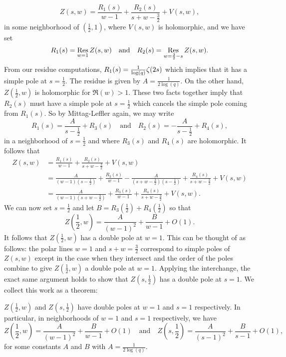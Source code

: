 \documentclass[12pt,reqno,oneside]{amsart}
\begin{document}
    \[
        Z(s,w) = \frac{R_{1}(s)}{w-1}+\frac{R_{2}(s)}{s+w-\frac{3}{2}}+V(s,w),
    \]
    in some neighborhood of $\left(\frac{1}{2},1\right)$, where $V(s,w)$ is holomorphic, and we have set
    \[
        R_{1}(s) = \operatorname*{\mathrm{Res}}_{w = 1}Z(s,w) \quad \text{and} \quad R_{2}(s) = \operatorname*{\mathrm{Res}}_{w = \frac{3}{2}-s}Z(s,w).
    \]
    From our residue computations, $R_{1}(s) = \frac{1}{\log(q)}\zeta(2s)$ which implies that it has a simple pole at $s = \frac{1}{2}$. The residue is given by $A = \frac{1}{2\log(q)}$. On the other hand, $Z\left(\frac{1}{2},w\right)$ is holomorphic for $\Re(w) > 1$. These two facts together imply that $R_{2}(s)$ must have a simple pole at $s = \frac{1}{2}$ which cancels the simple pole coming from $R_{1}(s)$. So by Mittag-Leffler again, we may write
    \[
        R_{1}(s) = \frac{A}{s-\frac{1}{2}}+R_{3}(s) \quad \text{and} \quad R_{2}(s) = -\frac{A}{s-\frac{1}{2}}+R_{4}(s),
    \]
    in a neighborhood of $s = \frac{1}{2}$ and where $R_{3}(s)$ and $R_{4}(s)$ are holomorphic. It follows that
    \begin{align*}
        Z(s,w) &= \frac{R_{1}(s)}{w-1}+\frac{R_{2}(s)}{s+w-\frac{3}{2}}+V(s,w) \\ 
        &= \frac{A}{(w-1)\left(s-\frac{1}{2}\right)}+\frac{R_{3}(s)}{w-1}-\frac{A}{\left(s+w-\frac{3}{2}\right)\left(s-\frac{1}{2}\right)}+\frac{R_{4}(s)}{s+w-\frac{3}{2}}+V(s,w) \\
        &= \frac{A}{(w-1)\left(s+w-\frac{3}{2}\right)}+\frac{R_{3}(s)}{w-1}+\frac{R_{4}(s)}{s+w-\frac{3}{2}}+V(s,w).
    \end{align*}
    We can now set $s = \frac{1}{2}$ and let $B = R_{3}\left(\frac{1}{2}\right)+R_{4}\left(\frac{1}{2}\right)$ so that
    \[
        Z\left(\frac{1}{2},w\right) = \frac{A}{(w-1)^{2}}+\frac{B}{w-1}+O(1).
    \]
    It follows that $Z\left(\frac{1}{2},w\right)$ has a double pole at $w = 1$. This can be thought of as follows: the polar lines $w = 1$ and $s+w = \frac{3}{2}$ correspond to simple poles of $Z(s,w)$ except in the case when they intersect and the order of the poles combine to give $Z\left(\frac{1}{2},w\right)$ a double pole at $w = 1$. Applying the interchange, the exact same argument holds to show that $Z\left(s,\frac{1}{2}\right)$ has a double pole at $s = 1$. We collect this work as a theorem:

    \begin{theorem}\label{thm:double_poles_at_1/2}
        $Z\left(\frac{1}{2},w\right)$ and $Z\left(s,\frac{1}{2}\right)$ have double poles at $w = 1$ and $s = 1$ respectively. In particular, in neighborhoods of $w = 1$ and $s = 1$ respectively, we have
        \[
            Z\left(\frac{1}{2},w\right) = \frac{A}{(w-1)^{2}}+\frac{B}{w-1}+O(1) \quad \text{and} \quad Z\left(s,\frac{1}{2}\right) = \frac{A}{(s-1)^{2}}+\frac{B}{s-1}+O(1),
        \]
        for some constants $A$ and $B$ with $A = \frac{1}{2\log(q)}$. 
    \end{theorem}
\end{document}
